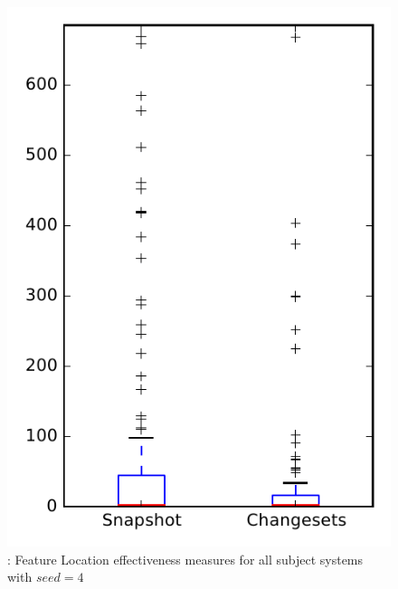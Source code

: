 
\begin{figure}
\centering
\includegraphics[height=0.4\textheight]{figures/flt_seed/rq1_overview_4}
\caption{\rone: Feature Location effectiveness measures for all subject systems with $seed=4$}
\label{fig:flt_seed:rq1:overview}
\end{figure}
